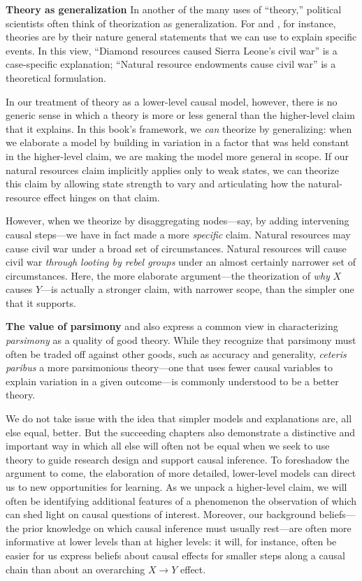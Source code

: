 \documentclass[12pt,]{book}
\begin{document}
\textbf{Theory as generalization} In another of the many uses of ``theory,'' political scientists often think of theorization as generalization. For \citet{Van-Evera:1997} and \citet{przeworski1970logic}, for instance, theories are by their nature general statements that we can use to explain specific events. In this view, ``Diamond resources caused Sierra Leone's civil war'' is a case-specific explanation; ``Natural resource endowments cause civil war'' is a theoretical formulation.

In our treatment of theory as a lower-level causal model, however, there is no generic sense in which a theory is more or less general than the higher-level claim that it explains. In this book's framework, we \emph{can} theorize by generalizing: when we elaborate a model by building in variation in a factor that was held constant in the higher-level claim, we are making the model more general in scope. If our natural resources claim implicitly applies only to weak states, we can theorize this claim by allowing state strength to vary and articulating how the natural-resource effect hinges on that claim.

However, when we theorize by disaggregating nodes---say, by adding intervening causal steps---we have in fact made a more \emph{specific} claim. Natural resources may cause civil war under a broad set of circumstances. Natural resources will cause civil war \emph{through looting by rebel groups} under an almost certainly narrower set of circumstances. Here, the more elaborate argument---the theorization of \emph{why} \(X\) causes \(Y\)---is actually a stronger claim, with narrower scope, than the simpler one that it supports.

\textbf{The value of parsimony} \citet{Van-Evera:1997} and \citet{przeworski1970logic} also express a common view in characterizing \emph{parsimony} as a quality of good theory. While they recognize that parsimony must often be traded off against other goods, such as accuracy and generality, \emph{ceteris paribus} a more parsimonious theory---one that uses fewer causal variables to explain variation in a given outcome---is commonly understood to be a better theory.

We do not take issue with the idea that simpler models and explanations are, all else equal, better. But the succeeding chapters also demonstrate a distinctive and important way in which all else will often not be equal when we seek to use theory to guide research design and support causal inference. To foreshadow the argument to come, the elaboration of more detailed, lower-level models can direct us to new opportunities for learning. As we unpack a higher-level claim, we will often be identifying additional features of a phenomenon the observation of which can shed light on causal questions of interest. Moreover, our background beliefs---the prior knowledge on which causal inference must usually rest---are often more informative at lower levels than at higher levels: it will, for instance, often be easier for us express beliefs about causal effects for smaller steps along a causal chain than about an overarching \(X \rightarrow Y\) effect.
\end{document}
